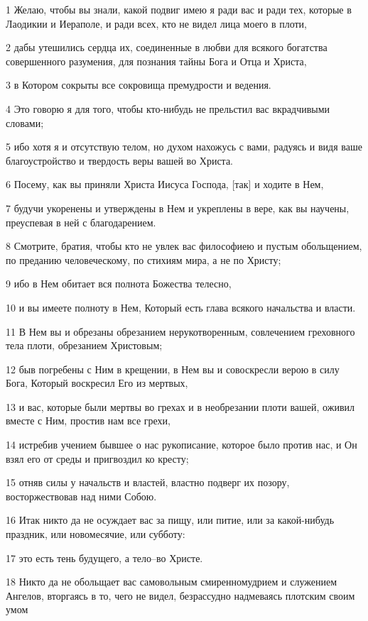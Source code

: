 \par 1 Желаю, чтобы вы знали, какой подвиг имею я ради вас и ради тех, которые в Лаодикии и Иераполе, и ради всех, кто не видел лица моего в плоти,
\par 2 дабы утешились сердца их, соединенные в любви для всякого богатства совершенного разумения, для познания тайны Бога и Отца и Христа,
\par 3 в Котором сокрыты все сокровища премудрости и ведения.
\par 4 Это говорю я для того, чтобы кто-нибудь не прельстил вас вкрадчивыми словами;
\par 5 ибо хотя я и отсутствую телом, но духом нахожусь с вами, радуясь и видя ваше благоустройство и твердость веры вашей во Христа.
\par 6 Посему, как вы приняли Христа Иисуса Господа, [так] и ходите в Нем,
\par 7 будучи укоренены и утверждены в Нем и укреплены в вере, как вы научены, преуспевая в ней с благодарением.
\par 8 Смотрите, братия, чтобы кто не увлек вас философиею и пустым обольщением, по преданию человеческому, по стихиям мира, а не по Христу;
\par 9 ибо в Нем обитает вся полнота Божества телесно,
\par 10 и вы имеете полноту в Нем, Который есть глава всякого начальства и власти.
\par 11 В Нем вы и обрезаны обрезанием нерукотворенным, совлечением греховного тела плоти, обрезанием Христовым;
\par 12 быв погребены с Ним в крещении, в Нем вы и совоскресли верою в силу Бога, Который воскресил Его из мертвых,
\par 13 и вас, которые были мертвы во грехах и в необрезании плоти вашей, оживил вместе с Ним, простив нам все грехи,
\par 14 истребив учением бывшее о нас рукописание, которое было против нас, и Он взял его от среды и пригвоздил ко кресту;
\par 15 отняв силы у начальств и властей, властно подверг их позору, восторжествовав над ними Собою.
\par 16 Итак никто да не осуждает вас за пищу, или питие, или за какой-нибудь праздник, или новомесячие, или субботу:
\par 17 это есть тень будущего, а тело--во Христе.
\par 18 Никто да не обольщает вас самовольным смиренномудрием и служением Ангелов, вторгаясь в то, чего не видел, безрассудно надмеваясь плотским своим умом

